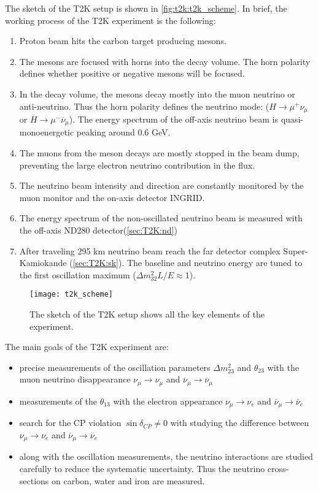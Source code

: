 \documentclass[../main.tex]{subfiles}
\begin{document}
The sketch of the T2K setup is shown in \autoref{fig:t2k:t2k_scheme}. In brief, the working process of the T2K experiment is the following:
\begin{enumerate}
  \item Proton beam hits the carbon target producing mesons.
  \item The mesons are focused with horns into the decay volume. The horn polarity defines whether positive or negative mesons will be focused.
  \item In the decay volume, the mesons decay mostly into the muon neutrino or anti-neutrino. Thus the horn polarity defines the neutrino mode: ($H\to\mu^+\nu_{\mu}$ or $\overline{H}\to\mu^-\overline{\nu}_{\mu}$). The energy spectrum of the off-axis neutrino beam is quasi-monoenergetic peaking around 0.6 GeV. 
  \item The muons from the meson decays are mostly stopped in the beam dump, preventing the large electron neutrino contribution in the flux.
  \item The neutrino beam intensity and direction are constantly monitored by the muon monitor and the on-axis detector INGRID.
  \item The energy spectrum of the non-oscillated neutrino beam is measured with the off-axis ND280 detector(\autoref{sec:T2K:nd})
  \item After traveling 295 km neutrino beam reach the far detector complex Super-Kamiokande (\autoref{sec:T2K:sk}). The baseline and neutrino energy are tuned to the first oscillation maximum ($\Delta m ^2_{32}L/E\approx1$).
\end{enumerate}

\begin{figure}[!ht]
  \centering
  \texttt{[image: t2k\_scheme]}
  \caption{The sketch of the T2K setup shows all the key elements of the experiment.}
  \label{fig:t2k:t2k_scheme}
\end{figure}

The main goals of the T2K experiment are:
\begin{itemize}
  \item precise measurements of the oscillation parameters $\Delta m^2_{23}$ and $\theta_{23}$ with the muon neutrino disappearance $\nu_\mu\to\nu_\mu$ and $\overline{\nu}_\mu\to\overline{\nu}_\mu$
  \item measurements of the  $\theta_{13}$ with the electron appearance $\nu_\mu\to\nu_e$ and $\overline{\nu}_\mu\to\overline{\nu}_e$
  \item search for the CP violation $\sin\delta_{CP}\neq0$ with studying the difference between $\nu_\mu\to\nu_e$ and $\overline{\nu}_\mu\to\overline{\nu}_e$
  \item along with the oscillation measurements, the neutrino interactions are studied carefully to reduce the systematic uncertainty. Thus the neutrino cross-sections on carbon, water and iron are measured.
\end{itemize}
\end{document}
